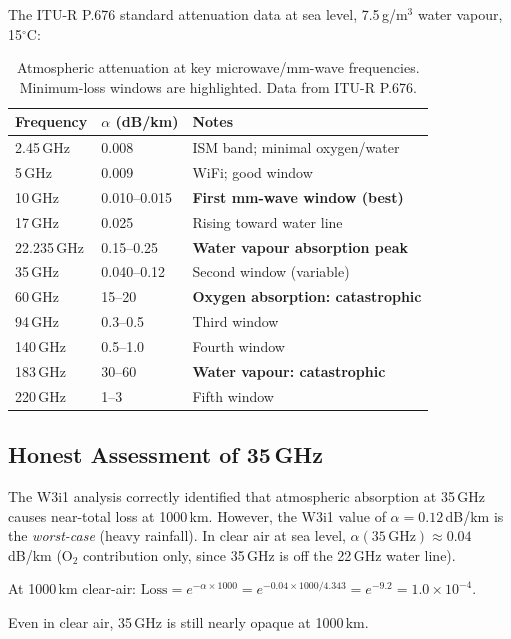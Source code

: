 \documentclass[aps,prd,twocolumn,superscriptaddress]{revtex4-2}
\begin{document}
The ITU-R P.676 standard attenuation data at sea level, 7.5\,g/m$^3$
water vapour, 15$^\circ$C:

\begin{table}[h]
\caption{Atmospheric attenuation at key microwave/mm-wave frequencies.
Minimum-loss windows are highlighted.  Data from ITU-R P.676.}
\label{tab:attenuation}
\begin{ruledtabular}
\begin{tabular}{lll}
Frequency & $\alpha$ (dB/km) & Notes \\
\hline
2.45\,GHz & 0.008 & ISM band; minimal oxygen/water \\
5\,GHz    & 0.009 & WiFi; good window \\
10\,GHz   & 0.010--0.015 & \textbf{First mm-wave window (best)} \\
17\,GHz   & 0.025 & Rising toward water line \\
22.235\,GHz & 0.15--0.25 & \textbf{Water vapour absorption peak} \\
35\,GHz   & 0.040--0.12 & Second window (variable) \\
60\,GHz   & 15--20 & \textbf{Oxygen absorption: catastrophic} \\
94\,GHz   & 0.3--0.5 & Third window \\
140\,GHz  & 0.5--1.0 & Fourth window \\
183\,GHz  & 30--60 & \textbf{Water vapour: catastrophic} \\
220\,GHz  & 1--3 & Fifth window \\
\end{tabular}
\end{ruledtabular}
\end{table}

\subsection{Honest Assessment of 35\,GHz}

The W3i1 analysis correctly identified that atmospheric absorption at
35\,GHz causes near-total loss at 1000\,km.  However, the W3i1 value
of $\alpha = 0.12$\,dB/km is the \emph{worst-case} (heavy rainfall).
In clear air at sea level, $\alpha(35\,\mathrm{GHz}) \approx 0.04$\,dB/km
(O$_2$ contribution only, since 35\,GHz is off the 22\,GHz water line).

At 1000\,km clear-air:
$\mathrm{Loss} = e^{-\alpha\times1000} = e^{-0.04\times1000/4.343}
= e^{-9.2} = 1.0\times10^{-4}$.

Even in clear air, 35\,GHz is still nearly opaque at 1000\,km.
\end{document}
